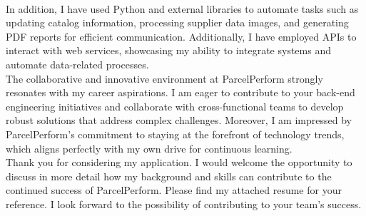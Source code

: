 \documentclass[11pt, a4paper]{awesome-cv}
\begin{document}
\begin{cvletter}
\\In addition, I have used Python and external libraries to automate tasks such as updating catalog information, processing supplier data images, and generating PDF reports for efficient communication. Additionally, I have employed APIs to interact with web services, showcasing my ability to integrate systems and automate data-related processes.
\\The collaborative and innovative environment at ParcelPerform strongly resonates with my career aspirations. I am eager to contribute to your back-end engineering initiatives and collaborate with cross-functional teams to develop robust solutions that address complex challenges. Moreover, I am impressed by ParcelPerform's commitment to staying at the forefront of technology trends, which aligns perfectly with my own drive for continuous learning.
\\Thank you for considering my application. I would welcome the opportunity to discuss in more detail how my background and skills can contribute to the continued success of ParcelPerform. Please find my attached resume for your reference. I look forward to the possibility of contributing to your team's success.





\end{cvletter}
\end{document}
